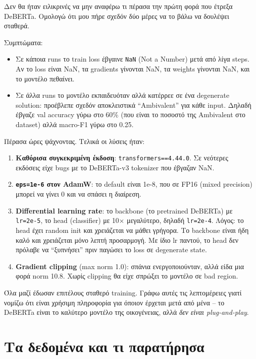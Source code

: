 \documentclass[12pt]{fphw}
\begin{document}
Δεν θα ήταν ειλικρινές να μην αναφέρω τι πέρασα την πρώτη φορά που έτρεξα DeBERTa. Ομολογώ ότι μου πήρε σχεδόν δύο μέρες να το βάλω να δουλέψει σταθερά.

Συμπτώματα:
\begin{itemize}
    \item Σε κάποια runs το train loss έβγαινε \texttt{NaN} (Not a Number) μετά από λίγα steps. Αν το loss είναι NaN, τα gradients γίνονται NaN, τα weights γίνονται NaN, και το μοντέλο πεθαίνει.
    \item Σε άλλα runs το μοντέλο εκπαιδευόταν αλλά κατέρρεε σε ένα degenerate solution: προέβλεπε σχεδόν αποκλειστικά ``Ambivalent'' για κάθε input. Δηλαδή έβγαζε val accuracy γύρω στο 60\% (που είναι το ποσοστό της Ambivalent στο dataset) αλλά macro-F1 γύρω στο 0.25.
\end{itemize}

Πέρασα ώρες ψάχνοντας. Τελικά οι λύσεις ήταν:

\begin{enumerate}
    \item \textbf{Καθόρισα συγκεκριμένη έκδοση}: \texttt{transformers==4.44.0}. Σε νεότερες εκδόσεις είχε bugs με το DeBERTa-v3 tokenizer που έβγαζαν NaN.
    \item \textbf{\texttt{eps=1e-6} στον AdamW}: το default είναι 1e-8, που σε FP16 (mixed precision) μπορεί να γίνει 0 και να σπάσει η διαίρεση.
    \item \textbf{Differential learning rate}: το backbone (το pretrained DeBERTa) με \texttt{lr=2e-5}, το head (classifier) με 10× μεγαλύτερο, δηλαδή \texttt{lr=2e-4}. Λόγος: το head έχει random init και χρειάζεται να μάθει γρήγορα. Το backbone είναι ήδη καλό και χρειάζεται μόνο λεπτή προσαρμογή. Με ίδιο lr παντού, το head δεν πρόλαβε να ``ξυπνήσει'' πριν παγώσει το loss σε degenerate state.
    \item \textbf{Gradient clipping} (max norm 1.0): σπάνια ενεργοποιούνταν, αλλά είδα μια φορά norm 10.8. Χωρίς clipping θα είχε σπρώξει το μοντέλο σε bad region.
\end{enumerate}

Όλα μαζί έδωσαν επιτέλους σταθερό training. Γράφω αυτές τις λεπτομέρειες γιατί νομίζω ότι είναι χρήσιμη πληροφορία για όποιον έρχεται μετά από μένα -- το DeBERTa είναι το καλύτερο μοντέλο της οικογένειας, αλλά \emph{δεν είναι plug-and-play}.

\section{Τα δεδομένα και τι παρατήρησα}
\end{document}
